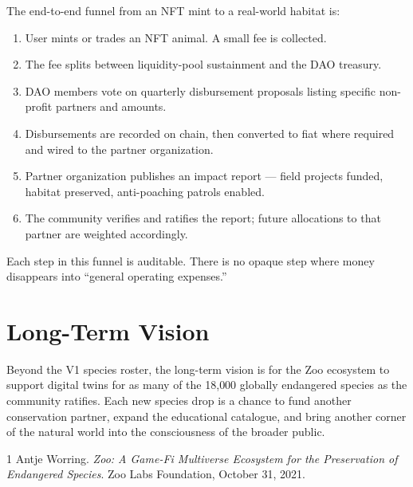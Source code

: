 \documentclass[11pt,letterpaper]{article}
\begin{document}
The end-to-end funnel from an NFT mint to a real-world habitat is:

\begin{enumerate}
  \item User mints or trades an NFT animal. A small fee is collected.
  \item The fee splits between liquidity-pool sustainment and the DAO treasury.
  \item DAO members vote on quarterly disbursement proposals listing specific non-profit partners and amounts.
  \item Disbursements are recorded on chain, then converted to fiat where required and wired to the partner organization.
  \item Partner organization publishes an impact report --- field projects funded, habitat preserved, anti-poaching patrols enabled.
  \item The community verifies and ratifies the report; future allocations to that partner are weighted accordingly.
\end{enumerate}

Each step in this funnel is auditable. There is no opaque step where money disappears into ``general operating expenses.''

\section{Long-Term Vision}

Beyond the V1 species roster, the long-term vision is for the Zoo ecosystem to support digital twins for as many of the 18{,}000 globally endangered species as the community ratifies. Each new species drop is a chance to fund another conservation partner, expand the educational catalogue, and bring another corner of the natural world into the consciousness of the broader public.

\begin{thebibliography}{1}
 Antje Worring. \emph{Zoo: A Game-Fi Multiverse Ecosystem for the Preservation of Endangered Species}. Zoo Labs Foundation, October 31, 2021.
\end{thebibliography}
\end{document}
